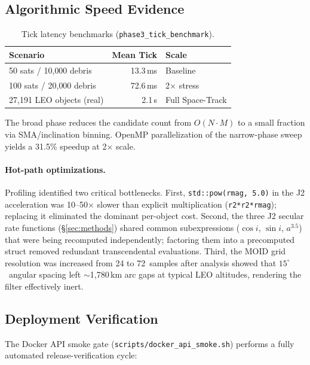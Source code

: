 \documentclass[10pt,twocolumn,letterpaper]{article}
\begin{document}
\subsection{Algorithmic Speed Evidence}

\begin{table}[h]
\centering\small
\begin{tabular}{@{}lrl@{}}
\toprule
\textbf{Scenario} & \textbf{Mean Tick} & \textbf{Scale} \\
\midrule
50 sats / 10{,}000 debris   & 13.3\,ms & Baseline \\
100 sats / 20{,}000 debris  & 72.6\,ms & 2$\times$ stress \\
27{,}191 LEO objects (real)  & 2.1\,s   & Full Space-Track \\
\bottomrule
\end{tabular}
\caption{Tick latency benchmarks (\texttt{phase3\_tick\_benchmark}).}
\label{tab:perf}
\end{table}

\noindent
The broad phase reduces the candidate count from $O(N \cdot M)$ to a
small fraction via SMA/inclination binning.  OpenMP parallelization of
the narrow-phase sweep yields a 31.5\% speedup at 2$\times$ scale.

\paragraph{Hot-path optimizations.}
Profiling identified two critical bottlenecks.  First,
\texttt{std::pow(rmag, 5.0)} in the J2 acceleration was 10--50$\times$
slower than explicit multiplication (\texttt{r2*r2*rmag}); replacing it
eliminated the dominant per-object cost.  Second, the three J2 secular
rate functions (\S\ref{sec:methods}) shared common subexpressions
($\cos i$, $\sin i$, $a^{3.5}$) that were being recomputed independently;
factoring them into a precomputed struct removed redundant
transcendental evaluations.  Third, the MOID grid resolution was increased
from 24 to 72~samples after analysis showed that $15^{\circ}$~angular
spacing left $\sim$1{,}780\,km arc gaps at typical LEO altitudes,
rendering the filter effectively inert.

\subsection{Deployment Verification}

The Docker API smoke gate (\texttt{scripts/docker\_api\_smoke.sh}) performs
a fully automated release-verification cycle:
\end{document}

